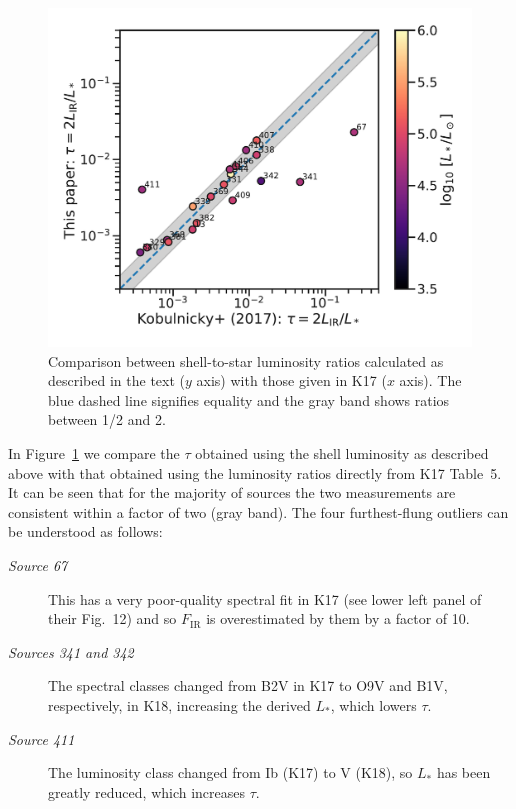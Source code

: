\begin{figure}
  \centering
  \includegraphics[width=\linewidth]{figs/K17-tau-comparison}
  \caption{Comparison between shell-to-star luminosity ratios
    calculated as described in the text (\(y\) axis) with those given
    in K17 (\(x\) axis).  The blue dashed line signifies equality and
    the gray band shows ratios between 1/2 and 2.}
  \label{fig:k17-k18-comparison}
\end{figure}

In Figure~\ref{fig:k17-k18-comparison} we compare the \(\tau\) obtained
using the shell luminosity as described above with that obtained using
the luminosity ratios directly from K17 Table~5.  It can be seen that
for the majority of sources the two measurements are consistent within
a factor of two (gray band).  The four furthest-flung outliers can be
understood as follows:
\begin{description}
\item[\textit{Source 67}] This has a very poor-quality spectral fit in
  K17 (see lower left panel of their Fig.~12) and so 
  \(F_{\text{IR}}\) is overestimated by them by a factor of 10.
\item[\textit{Sources 341 and 342}] The spectral classes changed from
  B2V in K17 to O9V and B1V, respectively, in K18, increasing the
  derived \(L_*\), which lowers \(\tau\).
\item[\textit{Source 411}] The luminosity class changed from Ib (K17)
  to V (K18), so \(L_*\) has been greatly reduced, which increases
  \(\tau\).
\end{description}

